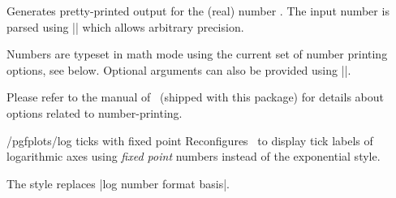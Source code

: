\begin{command}{\pgfmathprintnumber{}}
Generates pretty-printed output for the (real) number . The input number  is parsed using |\pgfmathfloatparsenumber| which allows arbitrary precision.

Numbers are typeset in math mode using the current set of number printing options, see below. Optional arguments can also be provided using ||.

Please refer to the manual of \PGFPlotstable\ (shipped with this package) for details about options related to number-printing.
\end{command}

\begin{stylekey}{/pgfplots/log ticks with fixed point}
	Reconfigures \PGFPlots\ to display tick labels of logarithmic axes using \emph{fixed point} numbers instead of the exponential style.

\begin{codeexample}[]
\end{codeexample}

\begin{codeexample}[]
\end{codeexample}

	The style replaces |log number format basis|.
\end{stylekey}

